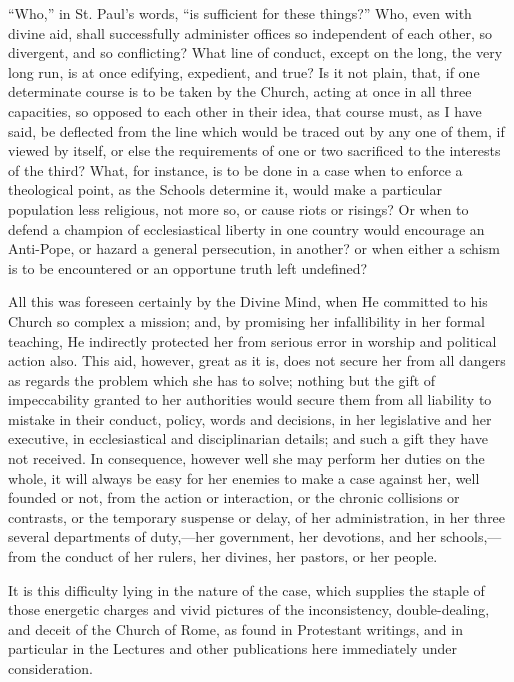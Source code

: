 ``Who,'' in St. Paul's words, ``is sufficient for these
things?'' Who, even with divine aid, shall successfully administer
offices so independent of each other, so divergent, and so
conflicting? What line of conduct, except on the long, the very long
run, is at once edifying, expedient, and true? Is it not plain, that,
if one determinate course is to be taken by the Church, acting at once
in all three capacities, so opposed to each other in their idea, that
course must, as I have said, be deflected from the line which would be
traced out by any one of them, if viewed by itself, or else the
requirements of one or two sacrificed to the interests of the third?
What, for instance, is to be done in a case when to enforce a
theological point, as the Schools determine it, would make a
particular population less religious, not more so, or cause riots or
risings? Or when to defend a champion of ecclesiastical liberty in one
country would encourage an Anti-Pope, or hazard a general persecution,
in another? or when either a schism is to be encountered or an
opportune truth left undefined?

All this was foreseen certainly by the Divine Mind, when He
committed to his Church so complex a mission; and, by promising her
infallibility in her formal teaching, He indirectly protected her from
serious error in worship and political action also. This aid,
however, great as it is, does not secure her from all dangers as
regards the problem which she has to solve; nothing but the gift of
impeccability granted to her authorities would secure them from all
liability to mistake in their conduct, policy, words and decisions, in
her legislative and her executive, in ecclesiastical and
disciplinarian details; and such a gift they have not received. In
consequence, however well she may perform her duties on the whole, it
will always be easy for her enemies to make a case against her, well
founded or not, from the action or interaction, or the chronic
collisions or contrasts, or the temporary suspense or delay, of her
administration, in her three several departments of duty,—her
government, her devotions, and her schools,—from the conduct of her
rulers, her divines, her pastors, or her people.

It is this difficulty lying in the nature of the case, which
supplies the staple of those energetic charges and vivid pictures of
the inconsistency, double-dealing, and deceit of the Church of Rome,
as found in Protestant writings, and in particular in the Lectures and
other publications here immediately under consideration.

